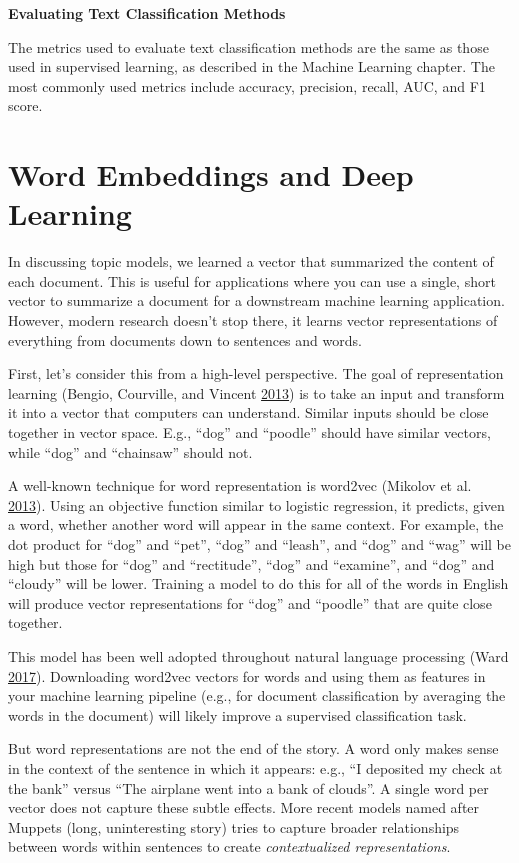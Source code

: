 \documentclass[]{krantz}
\begin{document}
\textbf{Evaluating Text Classification Methods}

The metrics used to evaluate text classification methods are the same as
those used in supervised learning, as described in the Machine Learning
chapter. The most commonly used metrics include accuracy, precision,
recall, AUC, and F1 score.

\section{Word Embeddings and Deep
Learning}\label{word-embeddings-and-deep-learning}

In discussing topic models, we learned a vector that summarized the
content of each document. This is useful for applications where you can
use a single, short vector to summarize a document for a downstream
machine learning application. However, modern research doesn't stop
there, it learns vector representations of everything from documents
down to sentences and words.

First, let's consider this from a high-level perspective. The goal of
representation learning (Bengio, Courville, and Vincent
\protect\hyperlink{ref-bengio-13}{2013}) is to take an input and
transform it into a vector that computers can understand. Similar inputs
should be close together in vector space. E.g., ``dog'' and ``poodle''
should have similar vectors, while ``dog'' and ``chainsaw'' should not.

A well-known technique for word representation is word2vec (Mikolov et
al. \protect\hyperlink{ref-mikolov-13}{2013}). Using an objective
function similar to logistic regression, it predicts, given a word,
whether another word will appear in the same context. For example, the
dot product for ``dog'' and ``pet'', ``dog'' and ``leash'', and ``dog''
and ``wag'' will be high but those for ``dog'' and ``rectitude'',
``dog'' and ``examine'', and ``dog'' and ``cloudy'' will be lower.
Training a model to do this for all of the words in English will produce
vector representations for ``dog'' and ``poodle'' that are quite close
together.

This model has been well adopted throughout natural language processing
(Ward \protect\hyperlink{ref-church-17}{2017}). Downloading word2vec
vectors for words and using them as features in your machine learning
pipeline (e.g., for document classification by averaging the words in
the document) will likely improve a supervised classification task.

But word representations are not the end of the story. A word only makes
sense in the context of the sentence in which it appears: e.g., ``I
deposited my check at the bank'' versus ``The airplane went into a bank
of clouds''. A single word per vector does not capture these subtle
effects. More recent models named after Muppets (long, uninteresting
story) tries to capture broader relationships between words within
sentences to create \emph{contextualized representations}.
\end{document}
